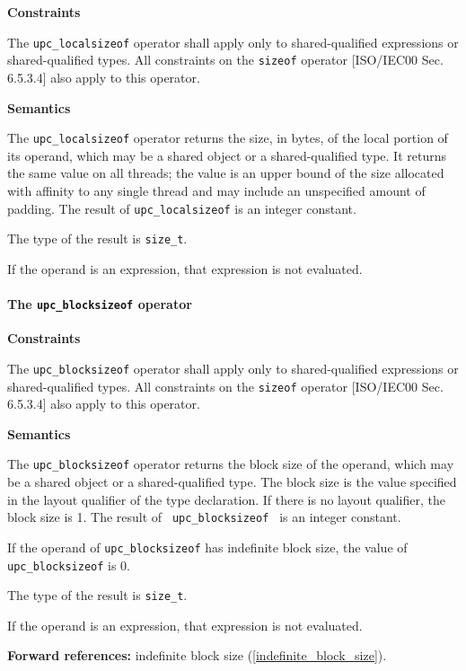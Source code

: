 {\bf Constraints} 

\npf The {\tt upc\_localsizeof} operator shall apply only to
     shared-qualified expressions or
     shared-qualified types.  All constraints on the {\tt sizeof} operator
     [ISO/IEC00 Sec. 6.5.3.4] also apply to this operator.

{\bf Semantics} 

\np The {\tt upc\_localsizeof} operator returns the size, in
     bytes, of the local portion of its operand, which may be a shared
     object or a shared-qualified type. It returns the same value on
     all threads; the value is an upper bound of the size allocated with
     affinity to any single thread and may include an unspecified amount of
     padding.  The result of {\tt upc\_localsizeof} is an integer constant.

\np The type of the result is {\tt size\_t}. 

\np If the operand is an expression, that expression
     is not evaluated.

\paragraph{The {\tt\bf upc\_blocksizeof} operator}
 

{\bf Constraints} 

\npf The {\tt upc\_blocksizeof} operator shall apply only to shared-qualified
     expressions or shared-qualified types.    All constraints on the {\tt sizeof} operator
     [ISO/IEC00 Sec. 6.5.3.4] also apply to this operator.

{\bf Semantics} 

\np The {\tt upc\_blocksizeof} operator returns the block
     size of the operand, which may be a shared object or a
     shared-qualified type.  The block size is the value specified in
     the layout qualifier of the type declaration. If there is no
     layout qualifier, the block size is 1.  The result of {\tt
     upc\_blocksizeof } is an integer constant.

\np If the operand of {\tt upc\_blocksizeof} has indefinite
     block size, the value of {\tt upc\_blocksizeof} is 0.

\np The type of the result is {\tt size\_t}. 

\np If the operand is an expression, that expression
     is not evaluated.

      {\bf Forward references:} indefinite block size (\ref{indefinite_block_size}).  
      


